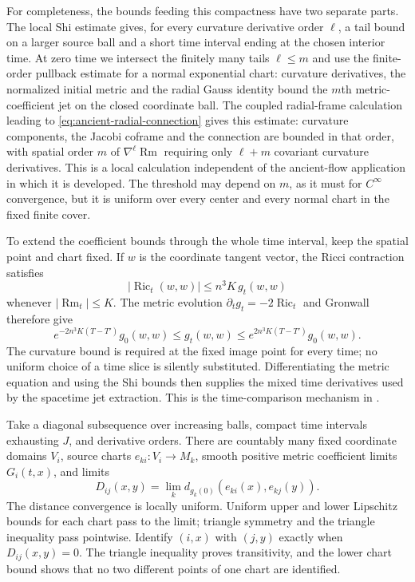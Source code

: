 For completeness, the bounds feeding this compactness have two
separate parts.  The local Shi estimate gives, for every curvature
derivative order $\ell$, a tail bound on a larger source ball and a
short time interval ending at the chosen interior time.  At zero time
we intersect the finitely many tails $\ell\leq m$ and use the
finite-order pullback estimate for a normal exponential chart:
curvature derivatives, the normalized initial metric and the radial
Gauss identity bound the $m$th metric-coefficient jet on the closed
coordinate ball.  The coupled radial-frame calculation leading to
\eqref{eq:ancient-radial-connection} gives this estimate: curvature
components, the Jacobi coframe and the connection are bounded in
that order, with spatial order $m$ of $\nabla^\ell\operatorname{Rm}$
requiring only $\ell+m$ covariant curvature derivatives.
This is a local calculation independent of the ancient-flow
application in which it is developed.  The threshold may depend on $m$, as it must for
$C^\infty$ convergence, but it is uniform over every center and every
normal chart in the fixed finite cover.

To extend the coefficient bounds through the whole time interval,
keep the spatial point and chart fixed.  If $w$ is the coordinate
tangent vector, the Ricci contraction satisfies
\[
 |\operatorname{Ric}_t(w,w)|
 \leq n^3K\,g_t(w,w)
\]
whenever $|\operatorname{Rm}_t|\leq K$.  The metric evolution
$\partial_tg_t=-2\operatorname{Ric}_t$ and Gronwall therefore give
\[
 e^{-2n^3K(T-T')}g_0(w,w)
 \leq g_t(w,w)
 \leq e^{2n^3K(T-T')}g_0(w,w).
\]
The curvature bound is required at the fixed image point for every
time; no uniform choice of a time slice is silently substituted.
Differentiating the metric equation and using the Shi bounds then
supplies the mixed time derivatives used by the spacetime jet
extraction.  This is the time-comparison mechanism in
\cite[Proposition 5.14, pp. 90--91; Theorem 5.15, pp. 91--92]{MT2007}.

Take a diagonal subsequence over increasing balls, compact time
intervals exhausting $J$, and derivative orders.  There are countably
many fixed coordinate domains $V_i$, source charts
$e_{ki}:V_i\to M_k$, smooth positive metric coefficient limits
$G_i(t,x)$, and limits
\[
                 D_{ij}(x,y)=\lim_k d_{g_k(0)}(e_{ki}(x),e_{kj}(y)).
\]
The distance convergence is locally uniform.  Uniform upper and lower
Lipschitz bounds for each chart pass to the limit; triangle symmetry
and the triangle inequality pass pointwise.  Identify $(i,x)$ with
$(j,y)$ exactly when $D_{ij}(x,y)=0$.  The triangle inequality proves
transitivity, and the lower chart bound shows that no two different
points of one chart are identified.

